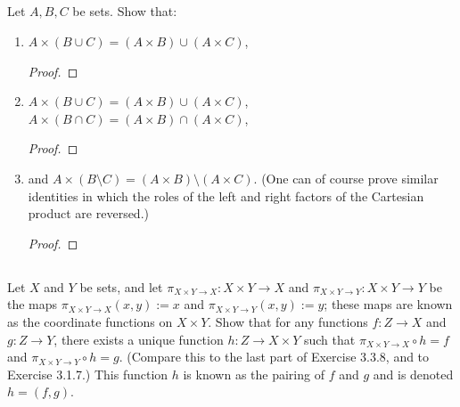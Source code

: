 \documentclass[../../main.tex]{subfiles}
\begin{document}
\subsection{}
\begin{q}
    Let $A, B, C$ be sets. Show that: 
    \begin{enumerate}
        \item $A \times (B \cup C) = (A \times B) \cup (A \times C)$,
        \begin{proof}
    
        \end{proof}
        \begin{xx}
            
        \end{xx}        
        \item $A \times (B \cup C) = (A \times B) \cup (A \times C)$, $A \times (B \cap C) = (A \times B) \cap (A \times C)$,
        \begin{proof}
    
        \end{proof}
        \begin{xx}
            
        \end{xx}        
        \item  and $A \times (B\setminus C) = (A \times B)\setminus(A \times C)$. (One can of course prove similar identities in which the roles of the left and right factors of the Cartesian product are reversed.)
        \begin{proof}
    
        \end{proof}
        \begin{xx}
            
        \end{xx}        
    \end{enumerate}    
\end{q}

\addtocounter{subsection}{2}
\subsection{}
\begin{q}
    Let $X$ and $Y$ be sets, and let $\pi_{X\times Y\to X} : X \times Y \to X$ and $\pi_{X\times Y\to Y} : X \times Y \to Y$ be the maps $\pi_{X\times Y\to X}(x, y) := x$ and $\pi_{X\times Y\to Y}(x, y) := y$; these maps are known as the coordinate functions on $X\times Y$. Show that for any functions $f : Z \to X$ and $g : Z \to Y$, there exists a unique function $h : Z \to X \times Y$ such that $\pi_{X\times Y\to X} \circ h = f$ and $\pi_{X\times Y\to Y} \circ h = g$. (Compare this to the last part of Exercise 3.3.8, and to Exercise 3.1.7.) This function $h$ is known as the pairing of $f$ and $g$ and is denoted $h = (f, g)$.
\end{q}
\end{document}
